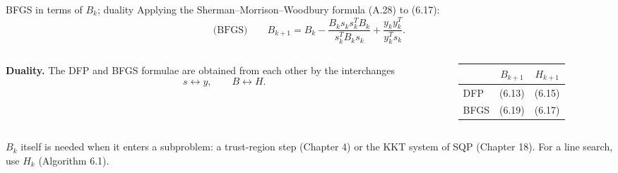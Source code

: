 \documentclass[aspectratio=169,12pt]{beamer}
\begin{document}
\begin{frame}{BFGS in terms of $B_{k}$; duality}
  Applying the Sherman--Morrison--Woodbury formula (A.28) to (6.17):
  \[
    \text{(BFGS)}\qquad
    B_{k+1}=B_{k}-\frac{B_{k}s_{k}s_{k}^{T}B_{k}}{s_{k}^{T}B_{k}s_{k}}+\frac{y_{k}y_{k}^{T}}{y_{k}^{T}s_{k}} .
    \tag{6.19}
  \]

  \begin{columns}[T,onlytextwidth]
    \begin{column}{0.60\textwidth}
      \textbf{Duality.} The DFP and BFGS formulae are obtained from each other by the
      interchanges
      \[ s\leftrightarrow y,\qquad B\leftrightarrow H . \]
    \end{column}
    \begin{column}{0.36\textwidth}
      \begin{center}
      \begin{tabular}{lcc}
        \toprule
        & $B_{k+1}$ & $H_{k+1}$ \\
        \midrule
        DFP & (6.13) & (6.15) \\
        BFGS & (6.19) & (6.17) \\
        \bottomrule
      \end{tabular}
      \end{center}
    \end{column}
  \end{columns}

  \vspace{0.5em}
  $B_{k}$ itself is needed when it enters a subproblem: a trust-region step (Chapter 4) or the
  KKT system of SQP (Chapter 18). For a line search, use $H_{k}$ (Algorithm 6.1).
\end{frame}
\end{document}

